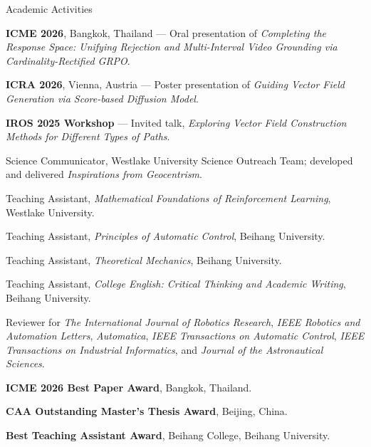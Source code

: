 \begin{rubric}{Academic Activities}

\entry*[2026] \textbf{ICME 2026}, Bangkok, Thailand --- Oral presentation of \emph{Completing the Response Space: Unifying Rejection and Multi-Interval Video Grounding via Cardinality-Rectified GRPO}.

\entry*[2026] \textbf{ICRA 2026}, Vienna, Austria --- Poster presentation of \emph{Guiding Vector Field Generation via Score-based Diffusion Model}.

\entry*[2025] \textbf{IROS 2025 Workshop} --- Invited talk, \emph{Exploring Vector Field Construction Methods for Different Types of Paths}.

\entry*[2025 -- Present] Science Communicator, Westlake University Science Outreach Team; developed and delivered \emph{Inspirations from Geocentrism}.

\entry*[2025] Teaching Assistant, \emph{Mathematical Foundations of Reinforcement Learning}, Westlake University.

\entry*[2022 -- 2023] Teaching Assistant, \emph{Principles of Automatic Control}, Beihang University.

\entry*[2021] Teaching Assistant, \emph{Theoretical Mechanics}, Beihang University.

\entry*[2020] Teaching Assistant, \emph{College English: Critical Thinking and Academic Writing}, Beihang University.

\entry*[2024 -- Present] Reviewer for \emph{The International Journal of Robotics Research}, \emph{IEEE Robotics and Automation Letters}, \emph{Automatica}, \emph{IEEE Transactions on Automatic Control}, \emph{IEEE Transactions on Industrial Informatics}, and \emph{Journal of the Astronautical Sciences}.

\entry*[2026] \textbf{ICME 2026 Best Paper Award}, Bangkok, Thailand.

\entry*[2025] \textbf{CAA Outstanding Master's Thesis Award}, Beijing, China.

\entry*[2021] \textbf{Best Teaching Assistant Award}, Beihang College, Beihang University.
\end{rubric}
